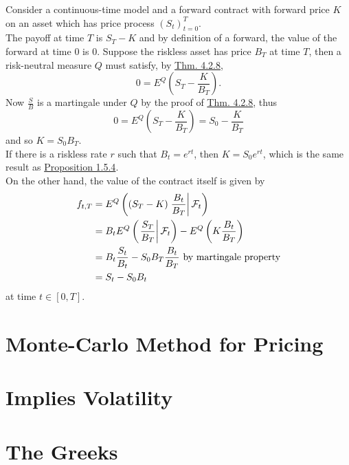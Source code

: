 \documentclass[11pt,fleqn]{book} %
\begin{document}
\begin{example} \label{eg:4215}
Consider a continuous-time model and a forward contract with forward price \(K\) on an asset which has price process \((S_t)_{t=0}^T\). \\
\indent The payoff at time \(T\) is \(S_T - K\) and by definition of a forward, the value of the forward at time 0 is 0. Suppose the riskless asset has price \(B_T\) at time \(T\), then a risk-neutral measure \(Q\) must satisfy, by \hyperref[thm:428]{Thm. 4.2.8}, 
\[
0 = E^Q\left(S_T - \frac{K}{B_T}\right).
\]
\indent Now \(\frac{S}{B}\) is a martingale under \(Q\) by the proof of \hyperref[thm:428]{Thm. 4.2.8}, thus
\[
0 = E^Q\left(S_T - \frac{K}{B_T}\right) = S_0 - \frac{K}{B_T}
\]
and so \(K = S_0B_T\). \\
\indent If there is a riskless rate \(r\) such that \(B_t = e^{rt}\), then \(K = S_0e^{rt}\), which is the same result as \hyperref[prop:154]{Proposition 1.5.4}. \\
\indent On the other hand, the value of the contract itself is given by
\[
\begin{aligned}
f_{t, T} &= E^Q\left((S_T - K)\left.\frac{B_t}{B_T}\right|\mathcal{F}_t\right) \\
&= B_tE^Q\left(\left.\frac{S_T}{B_T}\right|\mathcal{F}_t\right) - E^Q\left(K\frac{B_t}{B_T}\right) \\
&= B_t\frac{S_t}{B_t} - S_0B_T\frac{B_t}{B_T} \text{ by martingale property} \\
&= S_t - S_0B_t
\end{aligned}
\]
at time \(t \in [0, T]\).
\end{example}


\section{Monte-Carlo Method for Pricing}


\section{Implies Volatility}


\section{The Greeks}
\end{document}
